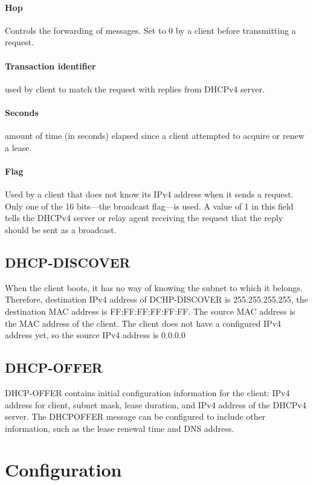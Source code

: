\paragraph{Hop}Controls the forwarding of messages. Set to 0 by a client before transmitting a request.

\paragraph{Transaction identifier} used by client to match the request with replies from DHCPv4 server.

\paragraph{Seconds} amount of time (in seconds) elapsed since a client attempted to acquire or renew a lease.

\paragraph{Flag}Used by a client that does not know its IPv4 address when it sends a
request. Only one of the 16 bits—the broadcast flag—is used. A value of 1 in
this field tells the DHCPv4 server or relay agent receiving the request that the
reply should be sent as a broadcast.

\subsection{DHCP-DISCOVER}

When the client boots, it has no way of knowing the subnet to which it belongs. Therefore, destination
IPv4 address of DCHP-DISCOVER is 255.255.255.255, the destination MAC address is FF:FF:FF:FF:FF:FF. The source MAC address is the MAC address of the client. The client does not have a configured IPv4 address
yet, so the source IPv4 address is 0.0.0.0 

\subsection{DHCP-OFFER}

DHCP-OFFER contains initial configuration information
for the client: IPv4 address for client, subnet mask, lease duration, and IPv4 address of the DHCPv4 server. The DHCPOFFER message can be configured to include other information, such as the lease renewal time and DNS address.


\section{Configuration}

